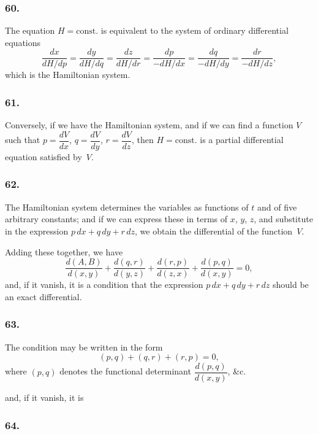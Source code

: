 \documentclass[11pt,a4paper]{book}
\begin{document}
\newpage
\setcounter{page}{139}

\subsubsection*{60.}

The equation $H = \text{const.}$ is equivalent to the system of ordinary differential equations
\[
\frac{dx}{dH/dp} = \frac{dy}{dH/dq} = \frac{dz}{dH/dr} = \frac{dp}{-dH/dx} = \frac{dq}{-dH/dy} = \frac{dr}{-dH/dz},
\]
which is the Hamiltonian system.

\subsubsection*{61.}

Conversely, if we have the Hamiltonian system, and if we can find a function $V$ such that $p = \dfrac{dV}{dx}$, $q = \dfrac{dV}{dy}$, $r = \dfrac{dV}{dz}$, then $H = \text{const.}$ is a partial differential equation satisfied by~$V$.

\subsubsection*{62.}

The Hamiltonian system determines the variables as functions of $t$ and of five arbitrary constants; and if we can express these in terms of $x$, $y$, $z$, and substitute in the expression $p\,dx + q\,dy + r\,dz$, we obtain the differential of the function~$V$.

\newpage
\setcounter{page}{140}

Adding these together, we have
\[
\frac{d(A, B)}{d(x, y)} + \frac{d(q, r)}{d(y, z)} + \frac{d(r, p)}{d(z, x)} + \frac{d(p, q)}{d(x, y)} = 0,
\]
and, if it vanish, it is a condition that the expression $p\,dx + q\,dy + r\,dz$ should be an exact differential.

\subsubsection*{63.}

The condition may be written in the form
\[
(p, q) + (q, r) + (r, p) = 0,
\]
where $(p, q)$ denotes the functional determinant $\dfrac{d(p, q)}{d(x, y)}$, \&c.

\newpage
\setcounter{page}{141}

and, if it vanish, it is

\subsubsection*{64.}
\end{document}
